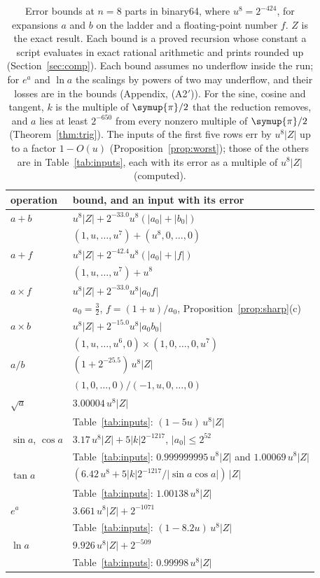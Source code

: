 \documentclass[conference]{IEEEtran}
\theoremstyle{definition}
\theoremstyle{remark}
\newcommand{\cpi}{\symup{\pi}}
\begin{document}
\nopagebreak
\begin{table}[H]
\centering
\caption{Error bounds at $n = 8$ parts in binary64, where $u^8 = 2^{-424}$, for expansions $a$ and $b$ on the
ladder and a floating-point number $f$. $Z$ is the exact result. Each bound is a proved recursion whose constant a
script evaluates in exact rational arithmetic and prints rounded up (Section~\ref{sec:comp}). Each bound assumes no underflow inside the run; for
$e^a$ and $\ln a$ the scalings by powers of two may underflow, and their losses are in the bounds (Appendix,
(A2$'$)). For the sine, cosine and tangent, $k$ is the multiple of $\cpi/2$ that the reduction removes, and $a$ lies at
least $2^{-650}$ from every nonzero multiple of $\cpi/2$ (Theorem~\ref{thm:trig}). The inputs of the first five rows err by $u^8|Z|$ up to a factor $1 - O(u)$ (Proposition~\ref{prop:worst});
those of the others are in Table~\ref{tab:inputs}, each with its error as a multiple of $u^8|Z|$ (computed).}
\label{tab:summary}
\small
\begin{tabular}{@{}ll@{}}
\toprule
operation & bound, and an input with its error \\
\midrule
$a + b$ & $u^8|Z| + 2^{-33.0}u^8(|a_0| + |b_0|)$ \\
& $(1, u, \dots, u^7) + (u^8, 0, \dots, 0)$ \\ \addlinespace
$a + f$ & $u^8|Z| + 2^{-42.4}u^8(|a_0| + |f|)$ \\
& $(1, u, \dots, u^7) + u^8$ \\ \addlinespace
$a \times f$ & $u^8|Z| + 2^{-33.0}u^8|a_0f|$ \\
& $a_0 = \frac32$, $f = (1+u)/a_0$, Proposition~\ref{prop:sharp}(c) \\ \addlinespace
$a \times b$ & $u^8|Z| + 2^{-15.0}u^8|a_0b_0|$ \\
& $(1, u, \dots, u^6, 0) \times (1, 0, \dots, 0, u^7)$ \\ \addlinespace
$a / b$ & $(1 + 2^{-25.5})\,u^8|Z|$ \\
& $(1, 0, \dots, 0) / (-1, u, 0, \dots, 0)$ \\ \addlinespace
$\sqrt a$ & $3.00004\,u^8|Z|$ \\
& Table~\ref{tab:inputs}: $(1 - 5u)\,u^8|Z|$ \\ \addlinespace
$\sin a$, $\cos a$ & $3.17\,u^8|Z| + 5|k|2^{-1217}$, $|a_0| \le 2^{52}$ \\
& Table~\ref{tab:inputs}: $0.999999995\,u^8|Z|$ and $1.00069\,u^8|Z|$ \\ \addlinespace
$\tan a$ & $(6.42\,u^8 + 5|k|2^{-1217}/|\sin a\cos a|)\,|Z|$ \\
& Table~\ref{tab:inputs}: $1.00138\,u^8|Z|$ \\ \addlinespace
$e^a$ & $3.661\,u^8|Z| + 2^{-1071}$ \\
& Table~\ref{tab:inputs}: $(1 - 8.2u)\,u^8|Z|$ \\ \addlinespace
$\ln a$ & $9.926\,u^8|Z| + 2^{-509}$ \\
& Table~\ref{tab:inputs}: $0.99998\,u^8|Z|$ \\
\bottomrule
\end{tabular}
\end{table}
\end{document}
